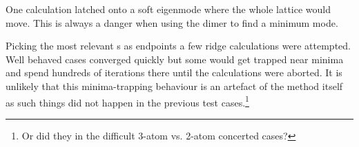 One calculation latched onto a soft eigenmode where the whole lattice would move.
This is always a danger when using the dimer to find a minimum mode.

Picking the most relevant s as endpoints a few ridge calculations were attempted.
Well behaved cases converged quickly but some would get trapped near minima and spend hundreds of iterations there until the calculations were aborted.
It is unlikely that this minima-trapping behaviour is an artefact of the method itself as such things did not happen in the previous test cases.\footnote{Or did they in the difficult 3-atom vs. 2-atom concerted cases?}



